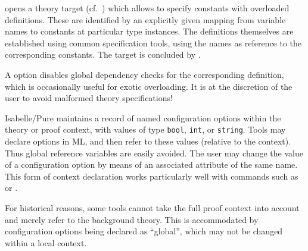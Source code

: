 \begin{isabellebody}
\begin{isamarkuptext}
\begin{descr}
  \item [\mbox{\isa{\isacommand{overloading}}}~\isa{{\isachardoublequote}x\isactrlsub {\isadigit{1}}\ {\isasymequiv}\ c\isactrlsub {\isadigit{1}}\ {\isacharcolon}{\isacharcolon}\ {\isasymtau}\isactrlsub {\isadigit{1}}\ {\isasymAND}\ {\isasymdots}\ x\isactrlsub n\ {\isasymequiv}\ c\isactrlsub n\ {\isacharcolon}{\isacharcolon}\ {\isasymtau}\isactrlsub n\ {\isasymBEGIN}{\isachardoublequote}}]
  opens a theory target (cf.\ ) which allows to
  specify constants with overloaded definitions.  These are identified
  by an explicitly given mapping from variable names  to constants  at particular type
  instances.  The definitions themselves are established using common
  specification tools, using the names  as
  reference to the corresponding constants.  The target is concluded
  by \mbox{}.

  A  option disables global dependency checks for
  the corresponding definition, which is occasionally useful for
  exotic overloading.  It is at the discretion of the user to avoid
  malformed theory specifications!

  \end{descr}%
\end{isamarkuptext}%
\isamarkuptrue%
%
\isamarkuptrue%
%
\begin{isamarkuptext}%
Isabelle/Pure maintains a record of named configuration options
  within the theory or proof context, with values of type \verb|bool|, \verb|int|, or \verb|string|.  Tools may declare
  options in ML, and then refer to these values (relative to the
  context).  Thus global reference variables are easily avoided.  The
  user may change the value of a configuration option by means of an
  associated attribute of the same name.  This form of context
  declaration works particularly well with commands such as \mbox{} or \mbox{}.

  For historical reasons, some tools cannot take the full proof
  context into account and merely refer to the background theory.
  This is accommodated by configuration options being declared as
  ``global'', which may not be changed within a local context.


\end{isamarkuptext}
\end{isabellebody}
